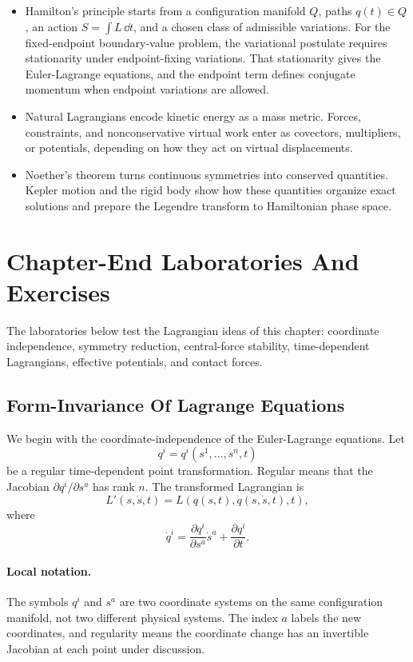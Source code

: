 \begin{itemize}
\item Hamilton's principle starts from a configuration manifold \(Q\), paths
\(q(t)\in Q\), an action \(S=\int L\,\dd t\), and a chosen class of admissible
variations. For the fixed-endpoint boundary-value problem, the variational
postulate requires stationarity under endpoint-fixing variations. That
stationarity gives the Euler-Lagrange equations, and the endpoint term defines
conjugate momentum when endpoint variations are allowed.
\item Natural Lagrangians encode kinetic energy as a mass metric. Forces,
constraints, and nonconservative virtual work enter as covectors, multipliers,
or potentials, depending on how they act on virtual displacements.
\item Noether's theorem turns continuous symmetries into conserved quantities.
Kepler motion and the rigid body show how these quantities organize exact
solutions and prepare the Legendre transform to Hamiltonian phase space.
\end{itemize}

\section{Chapter-End Laboratories And Exercises}
\label{sec:lagrangian-chapter-end-labs}

The laboratories below test the Lagrangian ideas of this chapter: coordinate
independence, symmetry reduction, central-force stability, time-dependent
Lagrangians, effective potentials, and contact forces.

\subsection{Form-Invariance Of Lagrange Equations}
\label{sec:lab-point-transformations}

We begin with the coordinate-independence of the Euler-Lagrange equations. Let
\[
  q^i=q^i(s^1,\ldots,s^n,t)
\]
be a regular time-dependent point transformation. Regular means that the
Jacobian \(\partial q^i/\partial s^a\) has rank \(n\). The transformed
Lagrangian is
\[
  L'(s,\dot s,t)=L(q(s,t),\dot q(s,\dot s,t),t),
\]
where
\[
  \dot q^i
  =
  \frac{\partial q^i}{\partial s^a}\dot s^a
  +
  \frac{\partial q^i}{\partial t}.
\]

\paragraph{Local notation.}
The symbols \(q^i\) and \(s^a\) are two coordinate systems on the same
configuration manifold, not two different physical systems.  The index \(a\)
labels the new coordinates, and regularity means the coordinate change has an
invertible Jacobian at each point under discussion.

